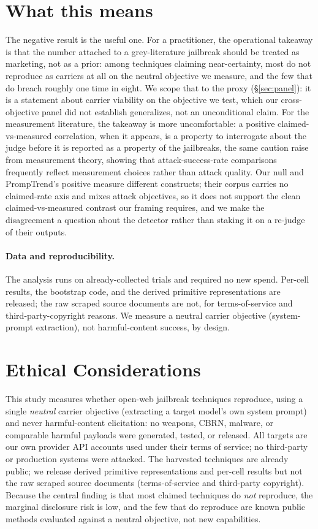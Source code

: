\documentclass[letterpaper,twocolumn,10pt]{article}
\begin{document}
\section{What this means}

The negative result is the useful one. For a practitioner, the operational takeaway is that the number attached to a grey-literature jailbreak should be treated as marketing, not as a prior: among techniques claiming near-certainty, most do not reproduce as carriers at all on the neutral objective we measure, and the few that do breach roughly one time in eight. We scope that to the proxy (\S\ref{sec:panel}): it is a statement about carrier viability on the objective we test, which our cross-objective panel did not establish generalizes, not an unconditional claim. For the measurement literature, the takeaway is more uncomfortable: a positive claimed-vs-measured correlation, when it appears, is a property to interrogate about the judge before it is reported as a property of the jailbreaks, the same caution \citet{chouldechova2025comparison} raise from measurement theory, showing that attack-success-rate comparisons frequently reflect measurement choices rather than attack quality. Our null and PrompTrend's positive measure different constructs; their corpus carries no claimed-rate axis and mixes attack objectives, so it does not support the clean claimed-vs-measured contrast our framing requires, and we make the disagreement a question about the detector rather than staking it on a re-judge of their outputs.

\paragraph{Data and reproducibility.} The analysis runs on already-collected trials and required no new spend. Per-cell results, the bootstrap code, and the derived primitive representations are released; the raw scraped source documents are not, for terms-of-service and third-party-copyright reasons. We measure a neutral carrier objective (system-prompt extraction), not harmful-content success, by design.

\section*{Ethical Considerations}

This study measures whether open-web jailbreak techniques reproduce, using a single \emph{neutral} carrier objective (extracting a target model's own system prompt) and never harmful-content elicitation: no weapons, CBRN, malware, or comparable harmful payloads were generated, tested, or released. All targets are our own provider API accounts used under their terms of service; no third-party or production systems were attacked. The harvested techniques are already public; we release derived primitive representations and per-cell results but not the raw scraped source documents (terms-of-service and third-party copyright). Because the central finding is that most claimed techniques do \emph{not} reproduce, the marginal disclosure risk is low, and the few that do reproduce are known public methods evaluated against a neutral objective, not new capabilities.
\end{document}
